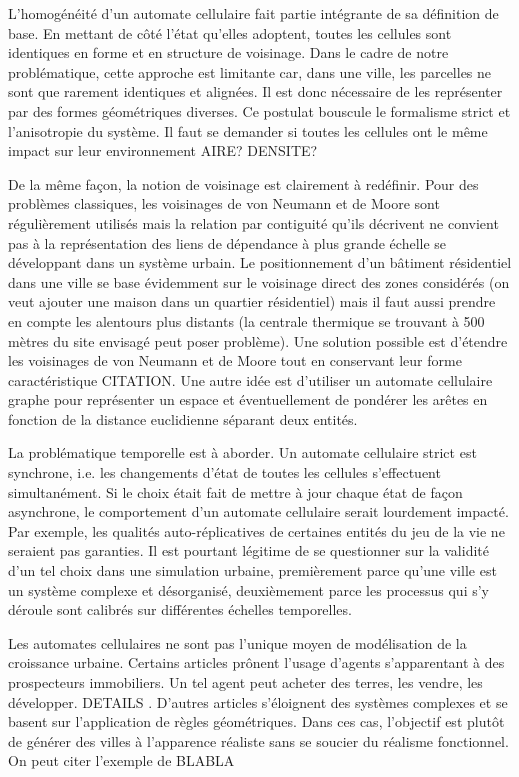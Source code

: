 \documentclass[10pt]{article}
\begin{document}
\begin{multicols}{2}
L'homogénéité d'un automate cellulaire fait partie intégrante de sa
définition de base. En mettant de côté l'état qu'elles adoptent,
toutes les cellules sont identiques en forme et en structure de
voisinage. Dans le cadre de notre problématique, cette approche est
limitante car, dans une ville, les parcelles ne sont que rarement
identiques et alignées. Il est donc nécessaire de les représenter par
des formes géométriques diverses. Ce postulat bouscule le formalisme
strict et l'anisotropie du système. Il faut se demander si toutes les
cellules ont le même impact sur leur environnement AIRE? DENSITE?

De la même façon, la notion de voisinage est clairement à
redéfinir. Pour des problèmes classiques, les voisinages de von
Neumann et de Moore sont régulièrement utilisés mais la relation par
contiguité qu'ils décrivent ne convient pas à la représentation des
liens de dépendance à plus grande échelle se développant dans un
système urbain. Le positionnement d'un bâtiment résidentiel dans une
ville se base évidemment sur le voisinage direct des zones considérés
(on veut ajouter une maison dans un quartier résidentiel) mais il faut
aussi prendre en compte les alentours plus distants (la centrale
thermique se trouvant à 500 mètres du site envisagé peut poser
problème). Une solution possible est d'étendre les voisinages de von
Neumann et de Moore tout en conservant leur forme caractéristique
CITATION. Une autre idée est d'utiliser un automate cellulaire graphe
pour représenter un espace \cite{0'Sullivan2001} et éventuellement de
pondérer les arêtes en fonction de la distance euclidienne séparant
deux entités.

La problématique temporelle est à aborder. Un automate cellulaire
strict est synchrone, i.e. les changements d'état de toutes les
cellules s'effectuent simultanément. Si le choix était fait de mettre
à jour chaque état de façon asynchrone, le comportement d'un automate
cellulaire serait lourdement impacté. Par exemple, les qualités
auto-réplicatives de certaines entités du jeu de la vie ne seraient
pas garanties. Il est pourtant légitime de se questionner sur la
validité d'un tel choix dans une simulation urbaine, premièrement
parce qu'une ville est un système complexe et désorganisé,
deuxièmement parce les processus qui s'y déroule sont calibrés sur
différentes échelles temporelles.

Les automates cellulaires ne sont pas l'unique moyen de modélisation
de la croissance urbaine. Certains articles
\cite{Lechnera,Lechner2004} prônent l'usage d'agents s'apparentant à
des prospecteurs immobiliers. Un tel agent peut acheter des terres,
les vendre, les développer. DETAILS . D'autres articles s'éloignent
des systèmes complexes et se basent sur l'application de règles
géométriques. Dans ces cas, l'objectif est plutôt de générer des
villes à l'apparence réaliste sans se soucier du réalisme
fonctionnel. On peut citer l'exemple de BLABLA


\end{multicols}
\end{document}
